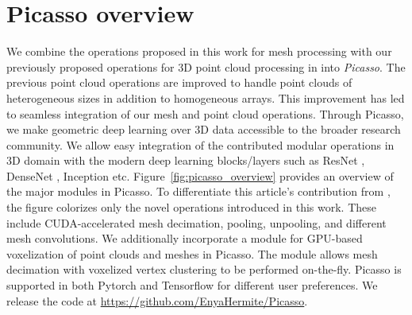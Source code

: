 \section{Picasso overview}\label{sec:overview}  
We combine the operations proposed in this work for mesh processing  with our previously proposed operations for 3D point cloud processing in \cite{lei2020spherical,lei2020seggcn} into 
\textit{Picasso}. 
The previous point cloud operations are improved to handle point clouds of heterogeneous sizes in addition to homogeneous arrays. This improvement has led to seamless integration of our mesh and point cloud operations. Through Picasso, we make geometric deep learning over 3D data accessible to the broader research community. 
We allow easy integration of the contributed modular operations in 3D domain with the modern deep learning blocks/layers such as ResNet \cite{he2016deep}, DenseNet \cite{huang2017densely}, Inception \cite{Szegedy2015googLeNet} etc.  
Figure~\ref{fig:picasso_overview} provides an overview of the major  modules in Picasso.
To differentiate this article's contribution from  \cite{lei2020spherical,lei2020seggcn}, the figure colorizes only the novel operations introduced in this work. These include CUDA-accelerated mesh decimation, pooling, unpooling, and different mesh convolutions.
We additionally incorporate a module for GPU-based voxelization of point clouds and meshes in Picasso. The module allows mesh decimation with voxelized vertex clustering to be performed on-the-fly. 
Picasso is supported in both Pytorch \cite{paszke2019pytorch} and Tensorflow \cite{abadi2016tensorflow} for different user preferences. 
We release the code at  \href{https://github.com/EnyaHermite/Picasso}{https://github.com/EnyaHermite/Picasso}.

\vspace{1.0mm}
